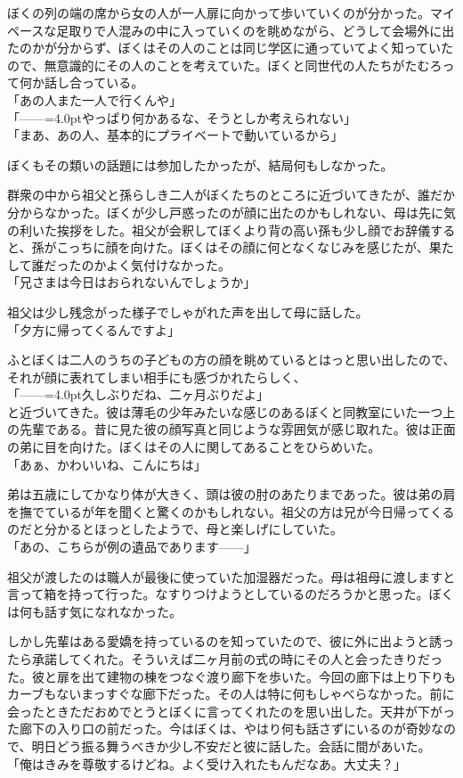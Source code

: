 \documentclass[b5j,twoside,twocolumn]{utarticle}
\begin{document}
ぼくの列の端の席から女の人が一人扉に向かって歩いていくのが分かった。マイペースな足取りで人混みの中に入っていくのを眺めながら、どうして会場外に出たのかが分からず、ぼくはその人のことは同じ学区に通っていてよく知っていたので、無意識的にその人のことを考えていた。ぼくと同世代の人たちがたむろって何か話し合っている。\\
「あの人また一人で行くんや」\\
「\tbaselineshift=2.5pt------\tbaselineshift=4.0ptやっぱり何かあるな、そうとしか考えられない」\\
「まあ、あの人、基本的にプライベートで動いているから」


ぼくもその類いの話題には参加したかったが、結局何もしなかった。


群衆の中から祖父と孫らしき二人がぼくたちのところに近づいてきたが、誰だか分からなかった。ぼくが少し戸惑ったのが顔に出たのかもしれない、母は先に気の利いた挨拶をした。祖父が会釈してぼくより背の高い孫も少し顔でお辞儀すると、孫がこっちに顔を向けた。ぼくはその顔に何となくなじみを感じたが、果たして誰だったのかよく気付けなかった。\\
「兄さまは今日はおられないんでしょうか」


祖父は少し残念がった様子でしゃがれた声を出して母に話した。\\
「夕方に帰ってくるんですよ」


ふとぼくは二人のうちの子どもの方の顔を眺めているとはっと思い出したので、それが顔に表れてしまい相手にも感づかれたらしく、\\
「\tbaselineshift=2.5pt------\tbaselineshift=4.0pt久しぶりだね、二ヶ月ぶりだよ」\\
と近づいてきた。彼は薄毛の少年みたいな感じのあるぼくと同教室にいた一つ上の先輩である。昔に見た彼の顔写真と同じような雰囲気が感じ取れた。彼は正面の弟に目を向けた。ぼくはその人に関してあることをひらめいた。\\
「あぁ、かわいいね、こんにちは」


弟は五歳にしてかなり体が大きく、頭は彼の肘のあたりまであった。彼は弟の肩を撫でているが年を聞くと驚くのかもしれない。祖父の方は兄が今日帰ってくるのだと分かるとほっとしたようで、母と楽しげにしていた。\\
「あの、こちらが例の遺品であります\tbaselineshift=2.5pt------\tbaselineshift=4.0pt」


祖父が渡したのは職人が最後に使っていた加湿器だった。母は祖母に渡しますと言って箱を持って行った。なすりつけようとしているのだろうかと思った。ぼくは何も話す気になれなかった。


しかし先輩はある愛嬌を持っているのを知っていたので、彼に外に出ようと誘ったら承諾してくれた。そういえば二ヶ月前の式の時にその人と会ったきりだった。彼と扉を出て建物の棟をつなぐ渡り廊下を歩いた。今回の廊下は上り下りもカーブもないまっすぐな廊下だった。その人は特に何もしゃべらなかった。前に会ったときただおめでとうとぼくに言ってくれたのを思い出した。天井が下がった廊下の入り口の前だった。今はぼくは、やはり何も話さずにいるのが奇妙なので、明日どう振る舞うべきか少し不安だと彼に話した。会話に間があいた。\\
「俺はきみを尊敬するけどね。よく受け入れたもんだなあ。大丈夫？」
\end{document}
